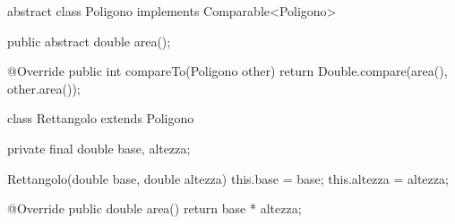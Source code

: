 \begin{unipdcode}[language=Java]
abstract class Poligono implements Comparable<Poligono> {
    public abstract double area();

    @Override
    public int compareTo(Poligono other) {
        return Double.compare(area(), other.area());
    }
}

class Rettangolo extends Poligono {
    private final double base, altezza;

    Rettangolo(double base, double altezza) {
        this.base = base;
        this.altezza = altezza;
    }

    @Override
    public double area() {
        return base * altezza;
    }
}
\end{unipdcode}
